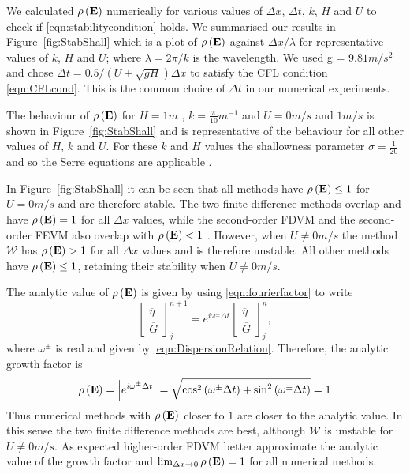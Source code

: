 We calculated $\rho\left(\mathbf{E} \right)$ numerically for various values of $\Delta x$, $\Delta t$, $k$, $H$ and $U$ to check if \eqref{eqn:stabilitycondition} holds. We summarised our results in Figure~\ref{fig:StabShall} which is a plot of $\rho\left(\mathbf{E}\right)$ against $\Delta x / \lambda$ for representative values of $k$, $H$ and $U$; where $\lambda = 2 \pi / k$ is the wavelength. We used g = $9.81m/s^2$ and chose $\Delta t = 0.5 / \left(U + \sqrt{gH}\right) \Delta x$ to satisfy the CFL condition \eqref{eqn:CFLcond}. This is the common choice of $\Delta t$ in our numerical experiments.

The behaviour of $\rho\left(\mathbf{E}\right)$ for $H=1 m$ , $k = \frac{\pi}{10} m^{-1}$ and $U = 0 m/s$ and $1 m/s$ is shown in Figure~\ref{fig:StabShall} and is representative of the behaviour for all other values of $H$, $k$ and $U$. For these $k$ and $H$ values the shallowness parameter $\sigma = \frac{1}{20}$ and so the Serre equations are applicable \cite{Barthelemy-2004-315}. 

In Figure~\ref{fig:StabShall} it can be seen that all methods have $\rho\left(\mathbf{E} \right) \le 1$ for $U=0m/s$ and are therefore stable. The two finite difference methods overlap and have $\rho\left(\mathbf{E} \right) = 1$ for all $\Delta x$ values, while the second-order FDVM and the second-order FEVM also overlap with $\rho\left(\mathbf{E} \right) < 1$ . However, when $U \neq 0m/s$ the method $\mathcal{W}$ has $\rho\left(\mathbf{E} \right) > 1$ for all $\Delta x$ values and is therefore unstable. All other methods have $\rho\left(\mathbf{E} \right) \le 1$, retaining their stability when $U \neq 0m/s$.

The analytic value of $\rho\left(\mathbf{E}\right)$ is given by using \eqref{eqn:fourierfactor} to write
\begin{equation*}
\begin{bmatrix}
\overline{\eta} \\ \overline{G}
\end{bmatrix}^{n+1}_j = e^{i \omega^\pm \Delta t}\begin{bmatrix}
\overline{\eta} \\ \overline{G}
\end{bmatrix}^{n}_j,
\end{equation*}
where $\omega^\pm$ is real and given by \eqref{eqn:DispersionRelation}.
Therefore, the analytic growth factor is
\begin{align}
\rho\left(\mathbf{E}\right) = \left| e^{i \omega^\pm \Delta t} \right| = \sqrt{\cos^2 \left(\omega^\pm \Delta t\right) + \sin^2 \left(\omega^\pm \Delta t\right)}  = 1
\end{align}
Thus numerical methods with $\rho\left(\mathbf{E}\right)$ closer to $1$ are closer to the analytic value. In this sense the two finite difference methods are best, although $\mathcal{W}$ is unstable for $U \neq 0m/s$. As expected higher-order FDVM better approximate the analytic value of the growth factor and $\lim_{\Delta x \rightarrow 0}\rho\left(\mathbf{E}\right) = 1$ for all numerical methods.

